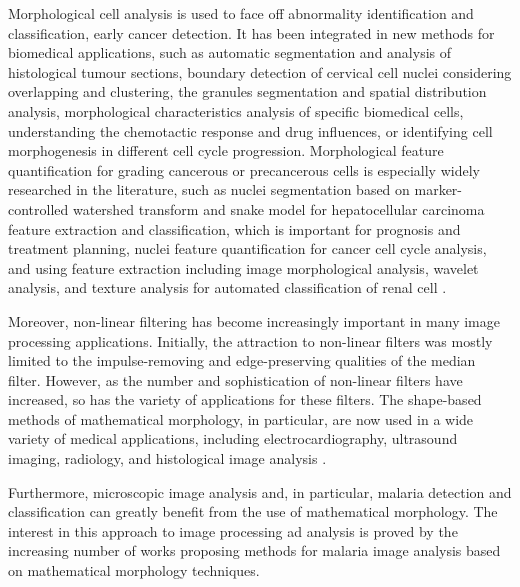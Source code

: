 \documentclass[sensors,review,submit,moreauthors,pdftex,10pt,a4paper]{mdpi}
\begin{document}
Morphological cell analysis is used to face off abnormality identification and classification, early cancer detection. It has been integrated in new methods for biomedical applications, such as automatic segmentation and analysis of histological tumour sections, boundary detection of cervical cell nuclei considering overlapping and clustering, the granules segmentation and spatial distribution analysis, morphological characteristics analysis of specific biomedical cells, understanding the chemotactic response and drug influences, or identifying cell morphogenesis in different cell cycle progression.
Morphological feature quantification for grading cancerous or precancerous cells is especially widely researched in the literature, such as nuclei segmentation based on marker-controlled watershed transform and snake model for hepatocellular carcinoma feature extraction and classification, which is important for prognosis and treatment planning, nuclei feature quantification for cancer cell cycle analysis, and using feature extraction including image morphological analysis, wavelet analysis, and texture analysis for automated classification of renal cell \cite{Chen2012}.

Moreover, non-linear filtering has become increasingly important in many image processing applications. Initially, the attraction to non-linear filters was mostly limited to the impulse-removing and edge-preserving qualities of the median filter. However, as the number and sophistication of non-linear filters have increased, so has the variety of applications for these filters. The shape-based methods of mathematical morphology, in particular, are now used in a wide variety of medical applications, including electrocardiography, ultrasound imaging, radiology, and histological image analysis \cite{Schulze1994}.

Furthermore, microscopic image analysis and, in particular, malaria detection and classification can greatly benefit from the use of mathematical morphology. The interest in this approach to image processing ad analysis is proved by the increasing number of works proposing methods for malaria image analysis based on mathematical morphology techniques.
\end{document}
